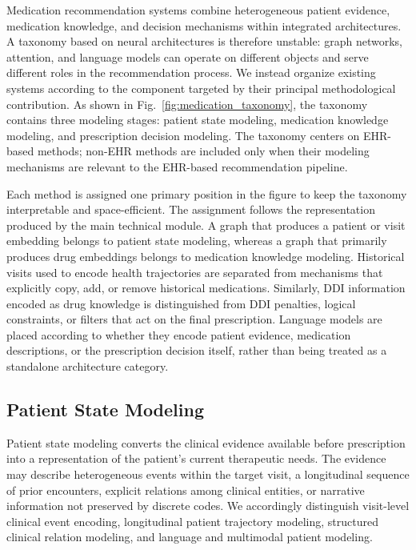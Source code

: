 \documentclass[manuscript,review]{acmart}
\begin{document}
Medication recommendation systems combine heterogeneous patient evidence, medication knowledge, and decision mechanisms within integrated architectures. A taxonomy based on neural architectures is therefore unstable: graph networks, attention, and language models can operate on different objects and serve different roles in the recommendation process. We instead organize existing systems according to the component targeted by their principal methodological contribution. As shown in Fig.~\ref{fig:medication_taxonomy}, the taxonomy contains three modeling stages: patient state modeling, medication knowledge modeling, and prescription decision modeling. The taxonomy centers on EHR-based methods; non-EHR methods are included only when their modeling mechanisms are relevant to the EHR-based recommendation pipeline.

Each method is assigned one primary position in the figure to keep the taxonomy interpretable and space-efficient. The assignment follows the representation produced by the main technical module. A graph that produces a patient or visit embedding belongs to patient state modeling, whereas a graph that primarily produces drug embeddings belongs to medication knowledge modeling. Historical visits used to encode health trajectories are separated from mechanisms that explicitly copy, add, or remove historical medications. Similarly, DDI information encoded as drug knowledge is distinguished from DDI penalties, logical constraints, or filters that act on the final prescription. Language models are placed according to whether they encode patient evidence, medication descriptions, or the prescription decision itself, rather than being treated as a standalone architecture category.

\subsection{Patient State Modeling}

Patient state modeling converts the clinical evidence available before prescription into a representation of the patient's current therapeutic needs. The evidence may describe heterogeneous events within the target visit, a longitudinal sequence of prior encounters, explicit relations among clinical entities, or narrative information not preserved by discrete codes. We accordingly distinguish visit-level clinical event encoding, longitudinal patient trajectory modeling, structured clinical relation modeling, and language and multimodal patient modeling.
\end{document}
